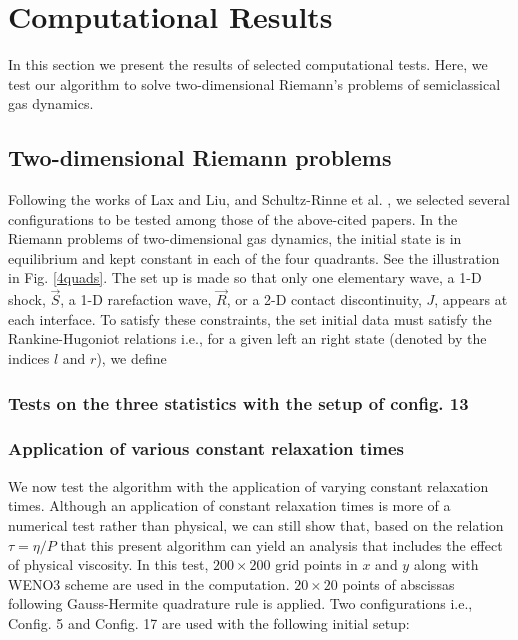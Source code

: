 \documentclass{rsproca}%
\begin{document}
\section{Computational Results}
\label{results}

In this section we present the results of selected computational tests.  Here, we test our algorithm to solve two-dimensional Riemann's problems of semiclassical gas dynamics.

\subsection{Two-dimensional Riemann problems}
\label{Riemannp}
Following the works of Lax and Liu, \cite{Laxliu95} and Schultz-Rinne et al. \cite{schultzrinne}, we selected several configurations to be tested among those of the above-cited papers. In the Riemann problems of two-dimensional gas dynamics, the initial state is in equilibrium and kept constant in each of the four quadrants. See the illustration in Fig. \ref{4quads}. The set up is made so that only one elementary wave, a 1-D  shock, $\vec{S}$, a 1-D rarefaction wave, $\vec{R}$, or a 2-D contact discontinuity, $J$, appears at each interface.
To satisfy these constraints, the set initial data must satisfy the Rankine-Hugoniot relations i.e., for a given left an right state (denoted by the indices $l$ and $r$), we define

\subsubsection{Tests on the three statistics with the setup of config. 13}
\label{configuration13}

\subsubsection{Application of various constant relaxation times}
\label{difftau}
We now test the algorithm with the application of varying constant relaxation times. Although an application of constant relaxation times is more of a numerical test rather than physical, we can still show that, based on the relation $\tau = \eta/P$ that this present algorithm can yield an analysis that includes the effect of physical viscosity. In this test, $200 \times 200$ grid points in $x$ and $y$ along with WENO3 scheme are used in the computation. $20 \times 20$ points of abscissas following Gauss-Hermite quadrature rule is applied. Two configurations i.e., Config. 5 and Config. 17 are used with the following initial setup:
\end{document}
